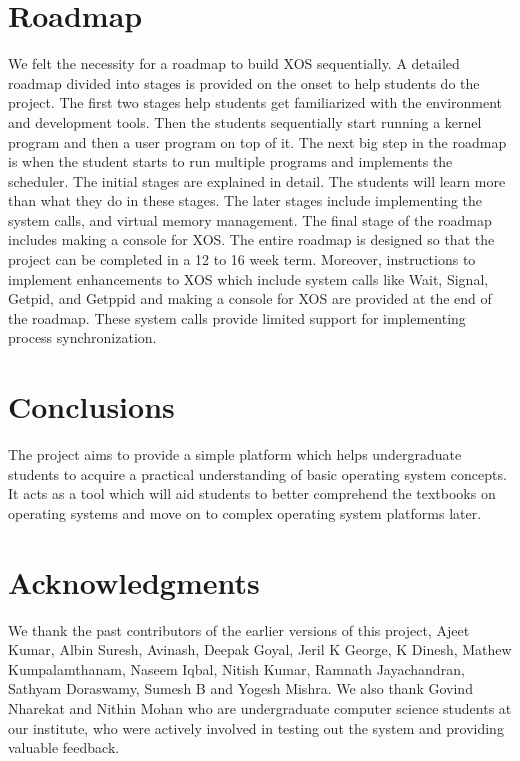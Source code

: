 \documentclass{sig-alternate}
\begin{document}
\section{Roadmap}
\label{sec:roadmap}
We felt the necessity for a roadmap to build XOS sequentially. A detailed roadmap divided into stages is provided on the onset to help students do the project. The first two stages help students get familiarized with the environment and development tools. Then the students sequentially start running a kernel program and then a user program on top of it. The next big step in the roadmap is when the student starts to run multiple programs and implements the scheduler. The initial stages are explained in detail. The students will learn more than what they do in these stages. The later stages include implementing the system calls, and virtual memory management. The final stage of the roadmap includes making a console for XOS. The entire roadmap is designed so that the project can be completed in a 12 to 16 week term. Moreover, instructions to implement enhancements to XOS which include system calls like Wait, Signal, Getpid, and Getppid and making a console for XOS are provided at the end of the roadmap. These system calls provide limited support for implementing process synchronization. \\
 
\section{Conclusions}
The project aims to provide a simple platform which helps undergraduate students to acquire a practical understanding of basic operating system concepts. It acts as a tool which will aid students to better comprehend the textbooks on operating systems and move on to complex operating system platforms later.


\section{Acknowledgments}
We thank the past contributors of the earlier versions of this project, Ajeet Kumar, Albin Suresh, Avinash, Deepak Goyal, Jeril K George, K Dinesh, Mathew Kumpalamthanam, Naseem Iqbal, Nitish Kumar, Ramnath Jayachandran, Sathyam Doraswamy, Sumesh B and Yogesh Mishra. We also thank Govind Nharekat and Nithin Mohan who are undergraduate computer science students at our institute, who were actively involved in testing out the system and providing valuable feedback. 
\end{document}
